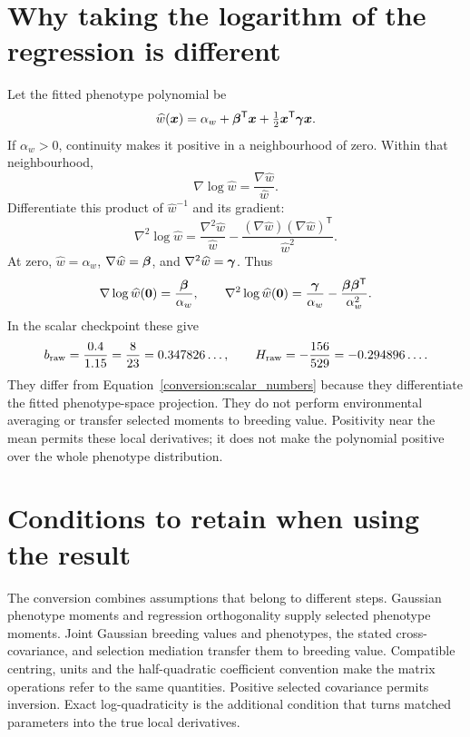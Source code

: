 \section{Why taking the logarithm of the regression is different}
\label{conversion:raw_log}

Let the fitted phenotype polynomial be
\[
 \widehat w(\boldsymbol{x})
 =\alpha_w+\boldsymbol{\beta}^{\mathsf T}\boldsymbol{x}
       +\tfrac12\boldsymbol{x}^{\mathsf T}\boldsymbol{\gamma}\boldsymbol{x}.
\]
If \(\alpha_w>0\), continuity makes it positive in a neighbourhood of zero.
Within that neighbourhood,
\[
 \nabla\log\widehat w=\frac{\nabla\widehat w}{\widehat w}.
\]
Differentiate this product of \(\widehat w^{-1}\) and its gradient:
\[
 \nabla^2\log\widehat w
 =\frac{\nabla^2\widehat w}{\widehat w}
  -\frac{(\nabla\widehat w)(\nabla\widehat w)^{\mathsf T}}
         {\widehat w^2}.
\]
At zero, \(\widehat w=\alpha_w\),
\(\nabla\widehat w=\boldsymbol{\beta}\), and
\(\nabla^2\widehat w=\boldsymbol{\gamma}\). Thus
\begin{equation}
 \nabla\log\widehat w(\boldsymbol{0})=\frac{\boldsymbol{\beta}}{\alpha_w},
 \qquad
 \nabla^2\log\widehat w(\boldsymbol{0})
 =\frac{\boldsymbol{\gamma}}{\alpha_w}
   -\frac{\boldsymbol{\beta}\boldsymbol{\beta}^{\mathsf T}}{\alpha_w^2}.
 \label{conversion:raw_derivatives}
\end{equation}
In the scalar checkpoint these give
\[
 b_{\rm raw}=\frac{0.4}{1.15}=\frac8{23}=0.347826\ldots,
 \qquad
 H_{\rm raw}=-\frac{156}{529}=-0.294896\ldots.
\]
They differ from Equation~\eqref{conversion:scalar_numbers} because they
differentiate the fitted phenotype-space projection. They do not perform
environmental averaging or transfer selected moments to breeding value.
Positivity near the mean permits these local derivatives; it does not make
the polynomial positive over the whole phenotype distribution.

\section{Conditions to retain when using the result}

The conversion combines assumptions that belong to different steps. Gaussian
phenotype moments and regression orthogonality supply selected phenotype
moments. Joint Gaussian breeding values and phenotypes, the stated
cross-covariance, and selection mediation transfer them to breeding value.
Compatible centring, units and the half-quadratic coefficient convention
make the matrix operations refer to the same quantities. Positive selected
covariance permits inversion. Exact log-quadraticity is the additional
condition that turns matched parameters into the true local derivatives.

